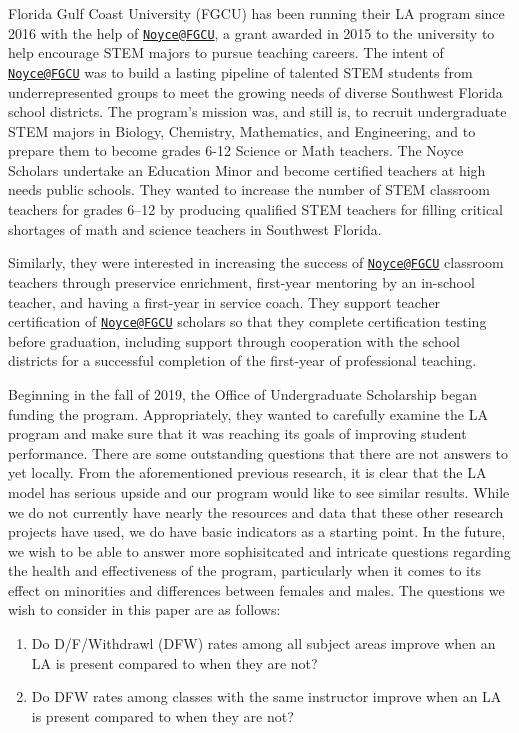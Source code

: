 \documentclass[]{article}
\providecommand{\tightlist}{%
  \setlength{\itemsep}{0pt}\setlength{\parskip}{0pt}}
\begin{document}
Florida Gulf Coast University (FGCU) has been running their LA program
since 2016 with the help of
\href{mailto:Noyce@FGCU}{\nolinkurl{Noyce@FGCU}}, a grant awarded in
2015 to the university to help encourage STEM majors to pursue teaching
careers. The intent of \href{mailto:Noyce@FGCU}{\nolinkurl{Noyce@FGCU}}
was to build a lasting pipeline of talented STEM students from
underrepresented groups to meet the growing needs of diverse Southwest
Florida school districts. The program's mission was, and still is, to
recruit undergraduate STEM majors in Biology, Chemistry, Mathematics,
and Engineering, and to prepare them to become grades 6-12 Science or
Math teachers. The Noyce Scholars undertake an Education Minor and
become certified teachers at high needs public schools. They wanted to
increase the number of STEM classroom teachers for grades 6--12 by
producing qualified STEM teachers for filling critical shortages of math
and science teachers in Southwest Florida. \cite{johnson}

Similarly, they were interested in increasing the success of
\href{mailto:Noyce@FGCU}{\nolinkurl{Noyce@FGCU}} classroom teachers
through preservice enrichment, first-year mentoring by an in-school
teacher, and having a first-year in service coach. They support teacher
certification of \href{mailto:Noyce@FGCU}{\nolinkurl{Noyce@FGCU}}
scholars so that they complete certification testing before graduation,
including support through cooperation with the school districts for a
successful completion of the first-year of professional teaching.

Beginning in the fall of 2019, the Office of Undergraduate Scholarship
began funding the program. Appropriately, they wanted to carefully
examine the LA program and make sure that it was reaching its goals of
improving student performance. There are some outstanding questions that
there are not answers to yet locally. From the aforementioned previous
research, it is clear that the LA model has serious upside and our
program would like to see similar results. While we do not currently
have nearly the resources and data that these other research projects
have used, we do have basic indicators as a starting point. In the
future, we wish to be able to answer more sophisitcated and intricate
questions regarding the health and effectiveness of the program,
particularly when it comes to its effect on minorities and differences
between females and males. The questions we wish to consider in this
paper are as follows:

\begin{enumerate}
\def\labelenumi{\arabic{enumi}.}
\tightlist
\item
  Do D/F/Withdrawl (DFW) rates among all subject areas improve when an
  LA is present compared to when they are not?
\item
  Do DFW rates among classes with the same instructor improve when an LA
  is present compared to when they are not?
\end{enumerate}
\end{document}
